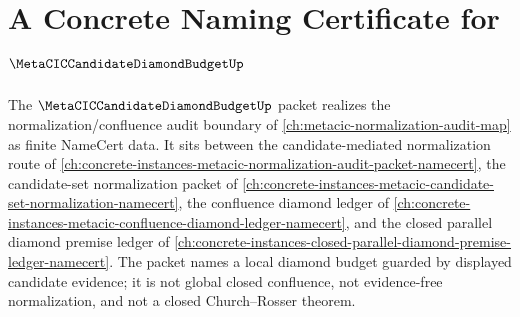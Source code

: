 \chapter{A Concrete Naming Certificate for $\MetaCICCandidateDiamondBudgetUp$}
\label{ch:concrete-instances-metacic-candidate-diamond-budget-namecert}

The $\MetaCICCandidateDiamondBudgetUp$ packet realizes the normalization/confluence audit boundary of \autoref{ch:metacic-normalization-audit-map} as finite NameCert data. It sits between the candidate-mediated normalization route of \autoref{ch:concrete-instances-metacic-normalization-audit-packet-namecert}, the candidate-set normalization packet of \autoref{ch:concrete-instances-metacic-candidate-set-normalization-namecert}, the confluence diamond ledger of \autoref{ch:concrete-instances-metacic-confluence-diamond-ledger-namecert}, and the closed parallel diamond premise ledger of \autoref{ch:concrete-instances-closed-parallel-diamond-premise-ledger-namecert}. The packet names a local diamond budget guarded by displayed candidate evidence; it is not global closed confluence, not evidence-free normalization, and not a closed Church--Rosser theorem.



